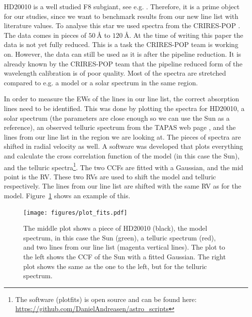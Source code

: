 \documentclass{aa}
\begin{document}
HD20010 is a well studied F8 subgiant, see e.g.
\cite{Mortier2013,Lebzelter2012}. Therefore, it is a prime object for
our studies, since we want to benchmark results from our new line list
with literature values. To analyse this star we used spectra from
the CRIRES-POP \citep{Lebzelter2012}. The data comes in pieces of
$\SI{50}{\angstrom}$ to $\SI{120}{\angstrom}$. At the time of writing
this paper the data is not yet fully reduced. This is a task the
CRIRES-POP team is working on. However, the data can still be used as it
is after the pipeline reduction. It is already known by the CRIRES-POP
team that the pipeline reduced form of the wavelength calibration is of
poor quality. Most of the spectra are stretched compared to e.g. a model
or a solar spectrum in the same region.

In order to measure the EWs of the lines in our line list, the correct
absorption lines need to be identified. This was done by plotting the
spectra for HD20010, a solar spectrum (the parameters are close enough
so we can use the Sun as a reference), an observed telluric spectrum
from the TAPAS web page \citep{Bertaux2014}, and the lines from our
line list in the region we are looking at. The pieces of spectra are
shifted in radial velocity as well. A software was developed that
plots everything and calculate the cross correlation function of the
model (in this case the Sun), and the telluric spectra\footnote{The
software (plot\textunderscore{}fits) is open source and can be found
here: \url{https://github.com/DanielAndreasen/astro_scripts}}. The two
CCFs are fitted with a Gaussian, and the mid point is the RV. These two
RVs are used to shift the model and telluric respectively. The lines
from our line list are shifted with the same RV as for the model.
Figure~\ref{fig:plot_fits} shows an example of this.

\begin{figure}[tbp!]
    \centering
    \texttt{[image: figures/plot\_fits.pdf]}
    \caption{The middle plot shows a piece of HD20010 (black), the model
    spectrum, in this case the Sun (green), a telluric spectrum (red), and two
    lines from our line list (magenta vertical lines). The plot to the left
    shows the CCF of the Sun with a fitted Gaussian. The right plot shows the
    same as the one to the left, but for the telluric spectrum.}
    \label{fig:plot_fits}
\end{figure}
\end{document}
